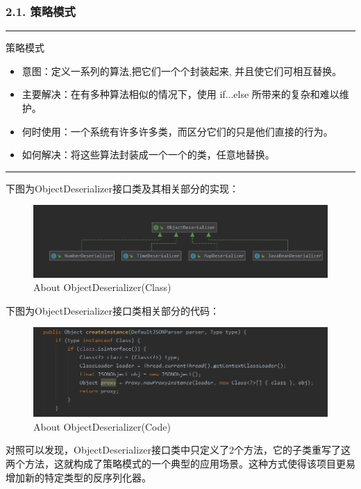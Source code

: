 \documentclass{article}
\begin{document}
\subsubsection*{2.1. 策略模式}
\noindent \rule{\textwidth}{0.7mm}
策略模式
\begin{itemize}
\item 意图：定义一系列的算法,把它们一个个封装起来, 并且使它们可相互替换。
\item 主要解决：在有多种算法相似的情况下，使用 if...else 所带来的复杂和难以维护。
\item 何时使用：一个系统有许多许多类，而区分它们的只是他们直接的行为。
\item 如何解决：将这些算法封装成一个一个的类，任意地替换。
\end{itemize}
\rule{\textwidth}{0.7mm}
下图为ObjectDeserializer接口类及其相关部分的实现：
\begin{figure}[H]
\centering %
\includegraphics[width = 15cm]{pic16.png}
\caption{About ObjectDeserializer(Class)}
\end{figure}
下图为ObjectDeserializer接口类相关部分的代码：
\begin{figure}[H]
\centering %
\includegraphics[width = 14cm]{pic17.png}
\caption{About ObjectDeserializer(Code)}
\end{figure}
对照可以发现，ObjectDeserializer接口类中只定义了2个方法，它的子类重写了这两个方法，这就构成了策略模式的一个典型的应用场景。这种方式使得该项目更易增加新的特定类型的反序列化器。
\end{document}
